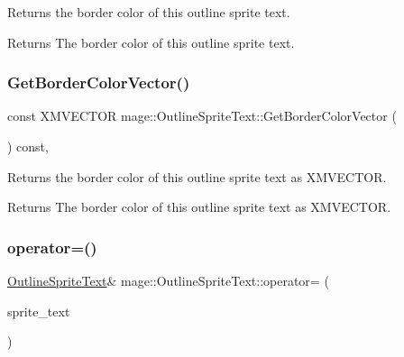 Returns the border color of this outline sprite text.

\begin{DoxyReturn}{Returns}
The border color of this outline sprite text. 
\end{DoxyReturn}
\hypertarget{classmage_1_1_outline_sprite_text_a287bef30662bbd00ca999b3577249226}{}\label{classmage_1_1_outline_sprite_text_a287bef30662bbd00ca999b3577249226} 
\subsubsection{\texorpdfstring{Get\+Border\+Color\+Vector()}{GetBorderColorVector()}}
{\footnotesize\ttfamily const X\+M\+V\+E\+C\+T\+OR mage\+::\+Outline\+Sprite\+Text\+::\+Get\+Border\+Color\+Vector (\begin{DoxyParamCaption}{ }\end{DoxyParamCaption}) const\hspace{0.3cm}{\ttfamily [private]}, {\ttfamily [noexcept]}}

Returns the border color of this outline sprite text as {\ttfamily X\+M\+V\+E\+C\+T\+OR}.

\begin{DoxyReturn}{Returns}
The border color of this outline sprite text as {\ttfamily X\+M\+V\+E\+C\+T\+OR}. 
\end{DoxyReturn}
\hypertarget{classmage_1_1_outline_sprite_text_a324ec8e5c0d319b449895cc45d6b3807}{}\label{classmage_1_1_outline_sprite_text_a324ec8e5c0d319b449895cc45d6b3807} 
\subsubsection{\texorpdfstring{operator=()}{operator=()}\hspace{0.1cm}{\footnotesize\ttfamily [1/2]}}
{\footnotesize\ttfamily \hyperlink{classmage_1_1_outline_sprite_text}{Outline\+Sprite\+Text}\& mage\+::\+Outline\+Sprite\+Text\+::operator= (\begin{DoxyParamCaption}\item[{const \hyperlink{classmage_1_1_outline_sprite_text}{Outline\+Sprite\+Text} \&}]{sprite\+\_\+text }\end{DoxyParamCaption})\hspace{0.3cm}{\ttfamily [delete]}}

